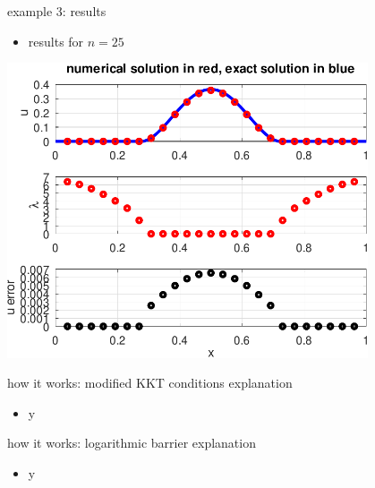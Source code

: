 \documentclass[10pt,hyperref]{beamer}
\begin{document}
\begin{frame}{example 3: results}

\begin{itemize}
\item results for $n=25$
\end{itemize}

\medskip
\begin{center}
\includegraphics[width=0.8\textwidth]{figs/errorobstacle.pdf}
\end{center}
\end{frame}


\begin{frame}{how it works: modified KKT conditions explanation}

\begin{itemize}
\item y
\end{itemize}
\end{frame}


\begin{frame}{how it works: logarithmic barrier explanation}

\begin{itemize}
\item y
\end{itemize}
\end{frame}
\end{document}
